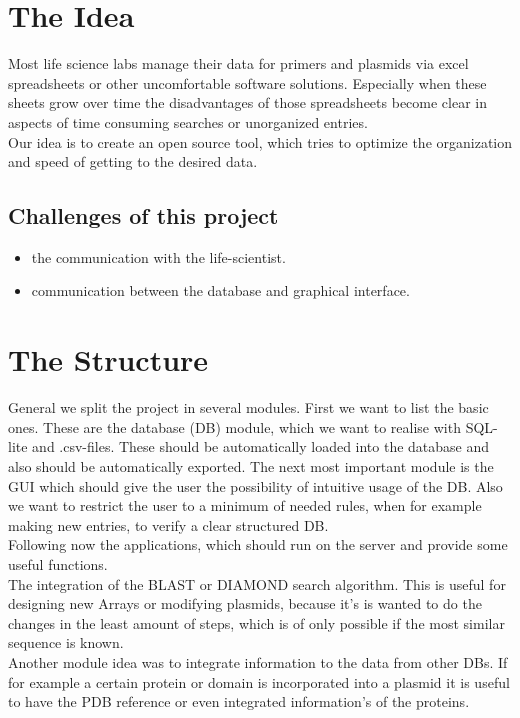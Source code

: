 \documentclass[]{article}
\begin{document}
\section{ The Idea}
Most life science labs manage their data for primers and plasmids via excel spreadsheets or other uncomfortable software solutions. Especially when these sheets grow over time the disadvantages of those spreadsheets become clear in aspects of time consuming searches or unorganized entries. 
\\
Our idea is to create an open source tool, which tries to optimize the organization and speed of getting to the desired data.

\subsection*{Challenges of this project}
\begin{itemize}
	\item the communication with the life-scientist.
	\item communication between the database and graphical interface.
\end{itemize}



\section{ The Structure}
General we split the project in several modules. First we want to list the basic ones. These are the database (DB) module, which we want to realise with SQL-lite and .csv-files. These should be automatically loaded into the database and also should be automatically exported.
The next most important module is the GUI which should give the user the possibility of intuitive usage of the DB. Also we want to restrict the user to a minimum of needed rules, when for example making new entries, to verify a clear structured DB.\\
Following now the applications, which should run on the server and provide some useful functions.\\
The integration of the BLAST or DIAMOND search algorithm. This is useful for designing new Arrays or modifying plasmids, because it's is wanted to do the changes in the least amount of steps, which is of only possible if the most similar sequence is known.\\
Another module idea was to integrate information to the data from other DBs. If for example a certain protein or domain is incorporated into a plasmid it is useful to have the PDB reference or even integrated information’s of the proteins.
\end{document}
